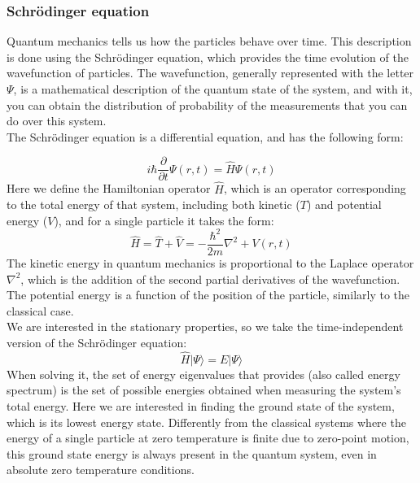 \documentclass{article}
\begin{document}
\subsubsection{Schrödinger equation}
Quantum mechanics tells us how the particles behave over time. This description is done using 
the Schrödinger equation, which provides the time evolution of the wavefunction of particles.
The wavefunction, generally represented with the letter $\Psi$, is a mathematical 
description of the quantum state of the system, and with it, you can obtain the distribution
of probability of the measurements that you can do over this system.\\

The Schrödinger equation is a differential equation, and has the following form:


\begin{equation}
i\hbar\frac{\partial}{\partial t}\Psi\left(r,t\right)=\hat{H}\Psi\left(r,t\right)
\end{equation}
Here we define the Hamiltonian operator $\hat{H}$, which is an operator corresponding to the total energy of that system, including both kinetic ($T$) and potential energy ($V$), and for a single particle it takes the form:
\begin{equation}
\hat{H}=\hat{T}+\hat{V}=-\frac{\hbar^2}{2m}\nabla^2+V\left(r,t\right)
\end{equation}
The kinetic energy in quantum mechanics is proportional to the Laplace operator $\nabla^2$, which is the addition of the second partial derivatives of the wavefunction. The potential energy is a function of the position of the particle, similarly to the classical case.\\

We are interested in the stationary properties, so we take the time-independent version of the Schrödinger equation:
\begin{equation}
\hat {H} |\Psi \rangle = E |\Psi \rangle
\end{equation}
When solving it, the set of energy eigenvalues that provides (also called energy spectrum) is the set of possible energies obtained when measuring the system’s total energy. Here we are interested in finding the ground state of the system, which is its lowest energy state. Differently from the classical systems where the energy of a single particle at zero temperature is finite due to zero-point motion, this ground state energy is always present in the quantum system, even in absolute zero temperature conditions. 
\end{document}
